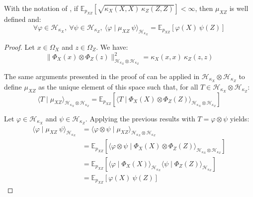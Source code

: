 \begin{proposition}\label{th:cross_covariance}
	With the notation of , if $\mathbb{E}_{p_{XZ}}\left[\sqrt{\kappa_X(X,X)\:\kappa_Z(Z,Z)}\right]<\infty$, then $\mu_{XZ}$ is well defined and:
	\begin{equation}
		\forall\varphi\in\mathcal{H}_{\kappa_X},\:\forall\psi\in\mathcal{H}_{\kappa_Z},\:\langle\varphi\mid\mu_{XZ}\:\psi\rangle_{\mathcal{H}_{\kappa_X}}=\mathbb{E}_{p_{XZ}}\left[\varphi(X)\:\psi(Z)\right]
	\end{equation}
\end{proposition}

\begin{proof}
	Let $x\in\Omega_X$ and $z\in\Omega_Z$. We have:
	\begin{equation}
		\|\Phi_X(x)\otimes\Phi_Z(z)\|_{\mathcal{H}_{\kappa_X}\otimes\mathcal{H}_{\kappa_Z}}^2=\kappa_X(x,x)\:\kappa_Z(z,z)
	\end{equation}

	The same arguments presented in the proof of  can be applied in $\mathcal{H}_{\kappa_X}\otimes\mathcal{H}_{\kappa_Z}$ to define $\mu_{XZ}$ as the unique element of this space such that, for all $T\in\mathcal{H}_{\kappa_X}\otimes\mathcal{H}_{\kappa_Z}$:
	\begin{equation}
		\langle T\mid\mu_{XZ}\rangle_{\mathcal{H}_{\kappa_X}\otimes\mathcal{H}_{\kappa_Z}}=\mathbb{E}_{p_{XZ}}\left[\langle T\mid\Phi_X(X)\otimes\Phi_Z(Z)\rangle_{\mathcal{H}_{\kappa_X}\otimes\mathcal{H}_{\kappa_Z}}\right]
	\end{equation}

	Let $\varphi\in\mathcal{H}_{\kappa_X}$ and $\psi\in\mathcal{H}_{\kappa_Z}$. Applying the previous results with $T=\varphi\otimes\psi$ yields:
	\begin{equation}
		\begin{aligned}
		\langle\varphi\mid\mu_{XZ}\:\psi\rangle_{\mathcal{H}_{\kappa_X}}&=\langle\varphi\otimes\psi\mid\mu_{XZ}\rangle_{\mathcal{H}_{\kappa_X}\otimes\mathcal{H}_{\kappa_Z}}\\
		&=\mathbb{E}_{p_{XZ}}\left[\langle\varphi\otimes\psi\mid\Phi_X(X)\otimes\Phi_Z(Z)\rangle_{\mathcal{H}_{\kappa_X}\otimes\mathcal{H}_{\kappa_Z}}\right]\\
		&=\mathbb{E}_{p_{XZ}}\left[\langle\varphi\mid\Phi_X(X)\rangle_{\mathcal{H}_{\kappa_X}}\langle\psi\mid\Phi_Z(Z)\rangle_{\mathcal{H}_{\kappa_Z}}\right]\\
		&=\mathbb{E}_{p_{XZ}}\left[\varphi(X)\:\psi(Z)\right]
		\end{aligned}
	\end{equation}
\end{proof}

